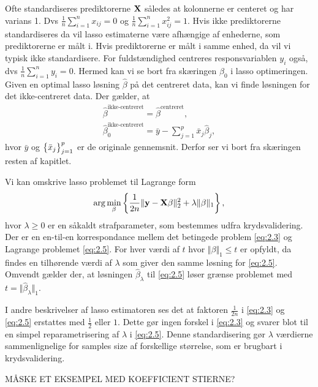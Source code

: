 Ofte standardiseres prediktorerne \(\mathbf{X}\) således at kolonnerne er centeret og har varians 1. Dvs \(\frac{1}{n} \sum_{i=1}^n x_{ij} = 0\) og \(\frac{1}{n} \sum_{i=1}^n x_{ij}^2=1\). Hvis ikke prediktorerne standardiseres da vil lasso estimaterne være afhængige af enhederne, som prediktorerne er målt i.
Hvis prediktorerne er målt i samme enhed, da vil vi typisk ikke standardisere.
For fuldstændighed centreres responsvariablen $y_i$ også, dvs \(\frac{1}{n} \sum_{i=1}^n y_{i} = 0\).
Hermed kan vi se bort fra skæringen $\beta_0$ i lasso optimeringen.
Given en optimal lasso løsning \(\hat{\beta}\) på det centreret data, kan vi finde løsningen for det ikke-centreret data. Der gælder, at
\begin{align*}
\hat{\beta}^{\text{ikke-centreret}} = \hat{\beta}^{\text{centreret}}, \\
\hat{\beta}_0^{\text{ikke-centreret}} = \bar{y} - \sum_{j=1}^p \bar{x}_j \hat{\beta}_j,
\end{align*}
hvor \(\bar{y}\) og \(\cbr{\bar{x}_j}_{j=1}^p\) er de originale gennemsnit.
Derfor ser vi bort fra skæringen resten af kapitlet.

Vi kan omskrive lasso problemet til Lagrange form
\begin{align}
\arg \min_{\beta} \cbr{\frac{1}{2n} \Vert \y - \X \beta \Vert_2^2 + \lambda \Vert \beta \Vert_1}, \label{eq:2.5}
\end{align}
hvor $\lambda \geq 0$ er en såkaldt strafparameter, som bestemmes udfra krydsvalidering. 
Der er en en-til-en korrespondance mellem det betingede problem \eqref{eq:2.3} og Lagrange problemet \eqref{eq:2.5}. 
For hver værdi af \(t\) hvor \(\Vert \beta \Vert_1 \leq t\) er opfyldt, da findes en tilhørende værdi af $\lambda$ som giver den samme løsning for \eqref{eq:2.5}.
Omvendt gælder der, at løsningen $\hat{\beta}_\lambda$ til \eqref{eq:2.5} løser grænse problemet med $t=\Vert \hat{\beta}_\lambda \Vert_1$.

I andre beskrivelser af lasso estimatoren ses det at faktoren \(\frac{1}{2n}\) i \eqref{eq:2.3} og \eqref{eq:2.5} erstattes med \(\frac{1}{2}\) eller \(1\).
Dette gør ingen forskel i \eqref{eq:2.3} og svarer blot til en simpel reparametrisering af \(\lambda\) i \eqref{eq:2.5}.
Denne standardisering gør \(\lambda\) værdierne sammenlignelige for samples size af forskellige størrelse, som er brugbart i krydsvalidering.

MÅSKE ET EKSEMPEL MED KOEFFICIENT STIERNE?

